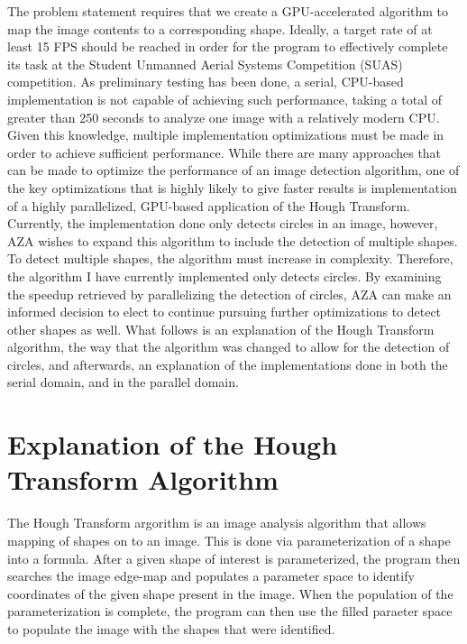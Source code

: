 \documentclass[conference]{IEEEtran}
\begin{document}
The problem statement requires that we create a GPU-accelerated algorithm to map the image contents to a corresponding shape.
Ideally, a target rate of at least 15 FPS should be reached in order for the program to effectively complete its task at the Student Unmanned Aerial Systems Competition (SUAS) competition.
As preliminary testing has been done, a serial, CPU-based implementation is not capable of achieving such performance, taking a total of greater than 250 seconds to analyze one image with a relatively modern CPU.
Given this knowledge, multiple implementation optimizations must be made in order to achieve sufficient performance. 
While there are many approaches that can be made to optimize the performance of an image detection algorithm, one of the key optimizations that is highly likely to give faster results is implementation of a highly parallelized, GPU-based application of the Hough Transform.
Currently, the implementation done only detects circles in an image, however, AZA wishes to expand this algorithm to include the detection of multiple shapes. 
To detect multiple shapes, the algorithm must increase in complexity. 
Therefore, the algorithm I have currently implemented only detects circles. 
By examining the speedup retrieved by parallelizing the detection of circles, AZA can make an informed decision to elect to continue pursuing further optimizations to detect other shapes as well. 
What follows is an explanation of the Hough Transform algorithm, the way that the algorithm was changed to allow for the detection of circles, and afterwards, an explanation of the implementations done in both the serial domain, and in the parallel domain.

\section{Explanation of the Hough Transform Algorithm}
The Hough Transform argorithm is an image analysis algorithm that allows mapping of shapes on to an image. 
This is done via parameterization of a shape into a formula. 
After a given shape of interest is parameterized, the program then searches the image edge-map and populates a parameter space to identify coordinates of the given shape present in the image. 
When the population of the parameterization is complete, the program can then use the filled paraeter space to populate the image with the shapes that were identified.
\end{document}
